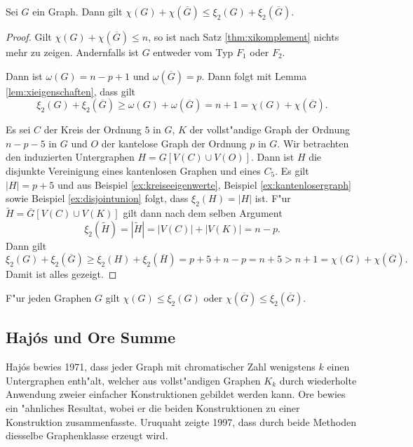 \begin{theorem}
  Sei $G$ ein Graph. Dann gilt $\chi(G) + \chi(\overline{G}) \leq \xi_{2}(G) +  \xi_{2}(\overline{G})$.
  \label{thm:xichromatisch}
\end{theorem}
\begin{proof}
  Gilt $\chi(G) + \chi(\overline{G}) \leq n$, so ist nach Satz \ref{thm:xikomplement} nichts mehr zu zeigen. Andernfalls ist $G$ entweder vom Typ $F_1$ oder $F_2$. 

   Dann ist $\omega(G) = n-p+1$ und $\omega (\overline{G})=p$. Dann folgt mit Lemma \ref{lem:xieigenschaften}, dass gilt
  $$\xi_{2}(G) + \xi_{2}(\overline{G}) \geq \omega(G) + \omega(\overline{G}) = n+ 1 = \chi(G) + \chi(\overline{G}).$$

   Es sei $C$ der Kreis der Ordnung $5$ in $G$, $K$ der vollst"andige Graph der Ordnung $n-p-5$ in $G$ und $O$ der kantelose Graph der Ordnung $p$ in $G$. Wir betrachten den induzierten Untergraphen $H=G[V(C) \cup V(O)]$. Dann ist $H$ die disjunkte Vereinigung eines kantenlosen Graphen und eines $C_5$. Es gilt $|H| = p+5$ und aus Beispiel \ref{ex:kreiseeigenwerte}, Beispiel \ref{ex:kantenlosergraph} sowie Beispiel \ref{ex:disjointunion} folgt, dass $\xi_{2}(H) = |H|$ ist. 
  F"ur $\tilde{H} = \overline{G} [V(C) \cup V(K)]$ gilt dann nach dem selben Argument $$\xi_{2}(\tilde{H}) = |\tilde{H}| = |V(C)| + |V(K)| = n-p .$$ Dann gilt 
  $$\xi_{2}(G) + \xi_{2}(\overline{G}) \geq \xi_{2}(H) + \xi_{2}(\overline{H}) = p+5 + n -p = n+ 5 > n+ 1 = \chi(G) + \chi(\overline{G}).$$
  Damit ist alles gezeigt.
\end{proof}

\begin{corollary}
  F"ur jeden Graphen $G$ gilt $\chi(G) \leq \xi_{2}(G)$ oder $\chi(\overline G) \leq \xi_{2}(\overline{G})$.
\end{corollary}

\subsection{Haj\'os und Ore Summe}
Haj\'os \cite{Hajos61} bewies 1971, dass jeder Graph mit chromatischer Zahl wenigstens $k$ einen Untergraphen enth"alt, welcher aus vollst"andigen Graphen $K_k$ durch wiederholte Anwendung zweier einfacher Konstruktionen gebildet werden kann. 
Ore \cite{Ore67} bewies ein "ahnliches Resultat, wobei er die beiden Konstruktionen zu einer Konstruktion zusammenfasste. Uruquaht \cite{Urquhart97} zeigte 1997, dass durch beide Methoden diesselbe Graphenklasse erzeugt wird. 


